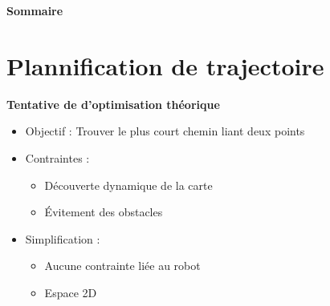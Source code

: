 \documentclass[aspectratio=169,10pt]{beamer}
\begin{document}
\begin{frame}{\textbf{Sommaire}}
    \tableofcontents
\end{frame}




\section{Plannification de trajectoire}

\begin{frame}{\textbf{Tentative de d'optimisation théorique}}
	\begin{itemize}
		\item Objectif : Trouver le plus court chemin liant deux points
		\vspace{0.2cm}
		\item Contraintes :
		\vspace{0.2cm}
		\begin{itemize}
			\item Découverte dynamique de la carte
			\vspace{0.2cm}
			\item Évitement des obstacles
		\end{itemize}
		\vspace{0.2cm}
		\item Simplification :
		\vspace{0.2cm}
		\begin{itemize}
			\item Aucune contrainte liée au robot
			\vspace{0.2cm}
			\item Espace 2D
		\end{itemize}
	\end{itemize}
	
\end{frame}
\end{document}
